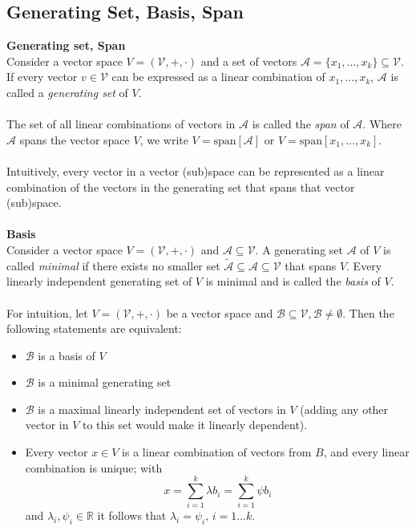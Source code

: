 \documentclass{report}
\begin{document}
\subsection{Generating Set, Basis, Span} %
\textbf{Generating set, Span}\\
Consider a vector space $V=(\mathcal{V},+,\cdot)$ and a set of vectors 
$\mathcal{A}=\{x_1,\ldots,x_k\}\subseteq\mathcal{V}$. If every vector $v\in\mathcal{V}$ can be 
expressed as a linear combination of $x_1,\ldots,x_k$, $\mathcal{A}$ is called a \textit{generating
set} of $V$.\\
\vspace{1mm}\\
The set of all linear combinations of vectors in $\mathcal{A}$ is called the \textit{span} of $\mathcal{A}$. 
Where $\mathcal{A}$ spans the vector space $V$, we write
$V=\text{span}[\mathcal{A}]$ or 
$V=\text{span}[x_1,\ldots,x_k]$.\\
\vspace{1mm}\\
Intuitively, every vector in a vector (sub)space can be represented as a
linear combination of the vectors in the generating set that spans that vector (sub)space.\\
\vspace{1mm}\\
\textbf{Basis}\\
Consider a vector space $V=(\mathcal{V},+,\cdot)$ and
$\mathcal{A}\subseteq\mathcal{V}$. A generating set $\mathcal{A}$ of $V$ is called 
\textit{minimal} if there exists no smaller set 
$\tilde{\mathcal{A}}\subseteq\mathcal{A}\subseteq\mathcal{V}$
that spans $V$. Every linearly independent generating set of $V$ is minimal and is called the 
\textit{basis} of $V$.\\
\vspace{1mm}\\
For intuition, let $V=(\mathcal{V},+,\cdot)$ be a vector space and 
$\mathcal{B}\subseteq\mathcal{V},\mathcal{B}\neq\emptyset$. Then the following statements are equivalent:
\begin{itemize}
\item$\mathcal{B}$ is a basis of $V$
\item$\mathcal{B}$ is a minimal generating set
\item$\mathcal{B}$ is a maximal linearly independent set of vectors in $V$ 
(adding any other vector in $V$ to this set would make it linearly dependent).
\item Every vector $x\in V$ is a linear combination of vectors from $B$, and every linear combination is unique;
with 
\begin{equation*}
x=\sum^k_{i=1}\lambda b_i=\sum^k_{i=1}\psi b_i
\end{equation*}
and $\lambda_i,\psi_i\in\mathbb{R}$ it follows that 
$\lambda_i=\psi_i,\,i=1\ldots k$.
\end{itemize}
\newpage
\end{document}
